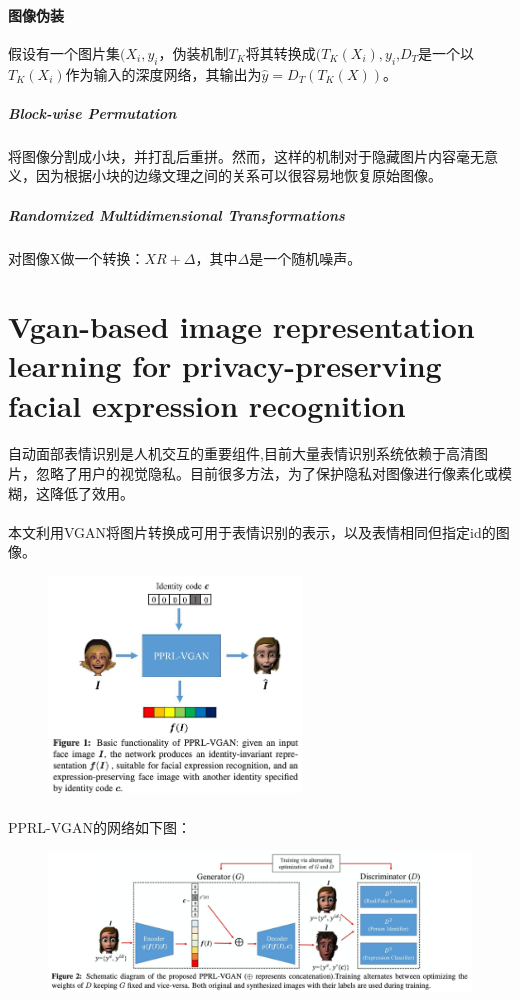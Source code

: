\documentclass[12pt,a4paper]{article}
\begin{document}
\paragraph{图像伪装} 假设有一个图片集${(X_i,y_i}$，伪装机制$T_K$将其转换成${(T_K(X_i),y_i}$,$D_T$是一个以$T_K(X_i)$作为输入的深度网络，其输出为$\hat y = D_T(T_K(X))$。
	\subparagraph{Block-wise Permutation} 将图像分割成小块，并打乱后重拼。然而，这样的机制对于隐藏图片内容毫无意义，因为根据小块的边缘文理之间的关系可以很容易地恢复原始图像。
	\subparagraph{Randomized Multidimensional Transformations} 对图像X做一个转换：$XR+\Delta$，其中$\Delta$是一个随机噪声。


\newpage
\section{Vgan-based image representation learning for privacy-preserving facial expression recognition\cite{pprl-vgan}}
\paragraph{}自动面部表情识别是人机交互的重要组件,目前大量表情识别系统依赖于高清图片，忽略了用户的视觉隐私。目前很多方法，为了保护隐私对图像进行像素化或模糊，这降低了效用。
\paragraph{} 本文利用VGAN将图片转换成可用于表情识别的表示，以及表情相同但指定id的图像。
\begin{figure}[H]
	\centering
	\includegraphics[width=0.6\textwidth]{../images/pprl-vgan.png}
	\caption{}
	\label{laplace-distribution}
\end{figure}

\paragraph{} PPRL-VGAN的网络如下图：
\begin{figure}[H]
	\centering
	\includegraphics[width=1.0\textwidth]{../images/pprl-vgan-network.png}
	\caption{}
	\label{laplace-distribution}
\end{figure}
\end{document}

